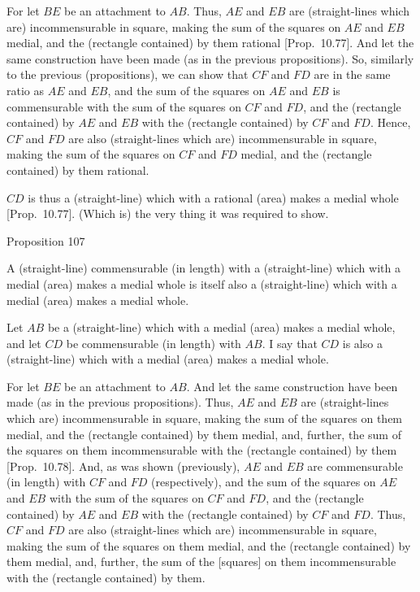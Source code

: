 For let $BE$ be an attachment to $AB$. Thus, $AE$ and
$EB$ are (straight-lines which are) incommensurable in square, making the sum of the
squares on $AE$ and $EB$ medial,  and the (rectangle contained)
by them rational [Prop.~10.77]. 
And let the same construction have been made (as in the previous propositions).
So, similarly
to the previous  (propositions), we can  show that $CF$ and $FD$
are in the same ratio as $AE$ and $EB$, and the sum of the squares
on $AE$ and $EB$ is commensurable with the sum of the squares on
$CF$ and $FD$, and the (rectangle contained) by $AE$ and $EB$
with the (rectangle contained) by $CF$ and $FD$. Hence, $CF$ and
$FD$ are also (straight-lines which are) incommensurable in square, making the sum of the
squares on $CF$ and $FD$ medial, and the (rectangle contained) by them
rational.

$CD$ is thus a (straight-line) which with a rational (area) makes a
medial whole [Prop.~10.77]. (Which is)
the very thing it was required to show.


\begin{center}
{\large Proposition 107}
\end{center}

A (straight-line) commensurable
(in length) with a (straight-line) which with a medial (area) makes a
medial whole is  itself also a (straight-line) which with a medial (area) makes
a medial whole.

\epsfysize=0.7in
\centerline{}

Let $AB$ be a (straight-line) which with a medial (area) makes a medial
whole, and let $CD$ be commensurable (in length) with $AB$.
I say that $CD$ is also a (straight-line) which with a medial (area) makes
a medial whole.

For let $BE$ be an attachment to $AB$. And let the same
construction have been made (as in the previous propositions). Thus,
$AE$ and $EB$ are (straight-lines which are) incommensurable in square, making
the sum of the squares on them medial, and the (rectangle contained)
by them medial, and, further, the sum of the squares on them incommensurable with the (rectangle contained) by them [Prop.~10.78].  And, as was shown (previously),
$AE$ and $EB$ are commensurable (in length) with $CF$ and $FD$ (respectively),
and the sum of the squares on $AE$ and $EB$ with the sum of the squares on
$CF$ and $FD$, and the (rectangle contained) by $AE$ and $EB$ with
the (rectangle contained) by $CF$ and $FD$. Thus, $CF$ and
$FD$ are also (straight-lines which are) incommensurable in square, making the sum of the squares on
them medial, and the (rectangle contained) by them medial, and, further,
the sum of the [squares] on them incommensurable with the (rectangle
contained) by them.

